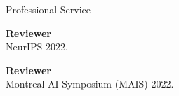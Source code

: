 \documentclass{resume}
\newcommand{\InternalSpace}{\vspace{0.18cm}}
\newenvironment{MySection}[1]
{\begin{category}{#1}}
{\end{category}}
\newcommand{\MyItem}{\citembullet}
\begin{document}




\begin{MySection}{Professional Service}

\MyItem \textbf{Reviewer} \\ NeurIPS 2022.

\MyItem \textbf{Reviewer} \\ Montreal AI Symposium (MAIS) 2022.

\end{MySection}

\InternalSpace















\end{document}
